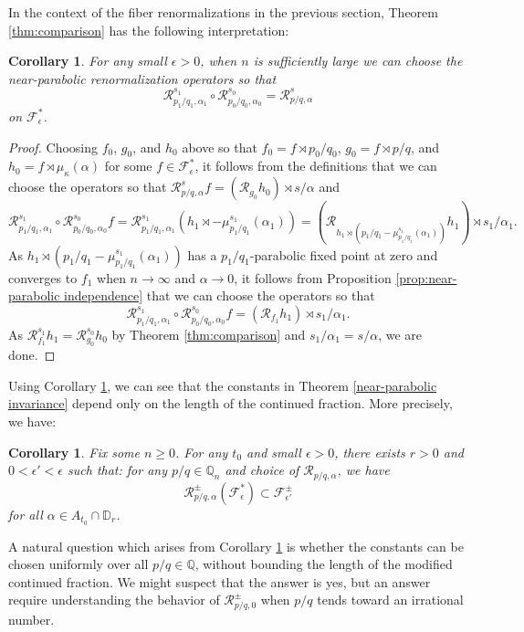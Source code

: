 \documentclass[12pt,letterpaper]{amsart}
\numberwithin{equation}{section}
\newtheorem{cor}[equation]{Corollary}
\theoremstyle{remark}
\theoremstyle{definition}
\newcommand{\D}{\mathbb D}
\newcommand{\Q}{\mathbb Q}
\newcommand{\FF}{\mathcal F}
\newcommand{\RR}{\mathcal R}
\begin{document}
	In the context of the fiber renormalizations in the previous section, Theorem \ref{thm:comparison} has the following interpretation:
	\begin{cor}\label{cor:comparison}
		For any small $\epsilon>0$,  when $n$ is sufficiently large we can choose the near-parabolic renormalization operators so that
		$$\RR_{p_1/q_1, \alpha_1}^{s_1}\circ \RR_{p_0/q_0, \alpha_0}^{s_0} = \RR_{p/q, \alpha}^s$$
		on $\FF_\epsilon^*$.
	\end{cor}
	
	\begin{proof}
		Choosing $f_0$, $g_0$, and $h_0$ above so that $f_0 = f\rtimes p_0/q_0$,  $g_0 = f\rtimes p/q$, and $h_0 = f\rtimes \mu_\kappa(\alpha)$ for some $f\in \FF_\epsilon^*$, it follows from the definitions that
		we can choose the operators so that 
		$\RR_{p/q, \alpha}^{s} f= (\RR_{g_0}h_0)\rtimes s/\alpha$ and 
		$$\RR_{p_1/q_1, \alpha_1}^{s_1}\circ\RR_{p_0/q_0, \alpha_0}^{s_0} f = \RR_{p_1/q_1, \alpha_1}^{s_1} (h_1\rtimes -\mu_{p_1/q_1}^{s_1}(\alpha_1)) = (\RR_{h_1\rtimes (p_1/q_1-\mu_{p_1/q_1}^{s_1}(\alpha_1))}h_1)\rtimes s_1/\alpha_1.$$
		As $h_1\rtimes (p_1/q_1-\mu_{p_1/q_1}^{s_1}(\alpha_1))$ has a $p_1/q_1$-parabolic fixed point at zero and converges to $f_1$ when $n\to \infty$ and $\alpha\to 0$, it follows from Proposition \ref{prop:near-parabolic independence} that we can choose the operators so that 
		$$\RR_{p_1/q_1, \alpha_1}^{s_1}\circ\RR_{p_0/q_0, \alpha_0}^{s_0} f =( \RR_{f_1}h_1)\rtimes s_1/\alpha_1.$$
		As $\RR_{f_1}^{s_1}h_1 =  \RR_{g_0}^{s_0}h_0$ by Theorem  \ref{thm:comparison} and $s_1/\alpha_1= s/\alpha$, we are done.
	\end{proof}
	
	Using Corollary \ref{cor:comparison}, we can see that the constants in Theorem \ref{near-parabolic invariance} depend only on the length of the continued fraction.
	More precisely, we have:
	\begin{cor}\label{uniform renormalization}
		Fix some $n\geq 0$. For any $t_0$ and small $\epsilon>0$, there exists $r>0$ and $0 < \epsilon' < \epsilon$ such that: for any $p/q\in \Q_n$ and choice of $\RR_{p/q, \alpha}$, we have 
		$$\mathcal{R}_{p/q, \alpha}^\pm(\mathcal{F}_\epsilon^*)\subset \mathcal{F}_{\epsilon'}^\pm$$
		for all $\alpha \in A_{t_0}\cap \D_r$.
	\end{cor}
	
	
	A natural question which arises from Corollary \ref{uniform renormalization} is whether the constants can be chosen uniformly over all $p/q\in \Q$, without bounding the length of the modified continued fraction. We might suspect that the answer is yes, but an answer require understanding the behavior of  $\mathcal{R}_{p/q, 0}^\pm$ when $p/q$ tends toward an irrational number.
\end{document}
